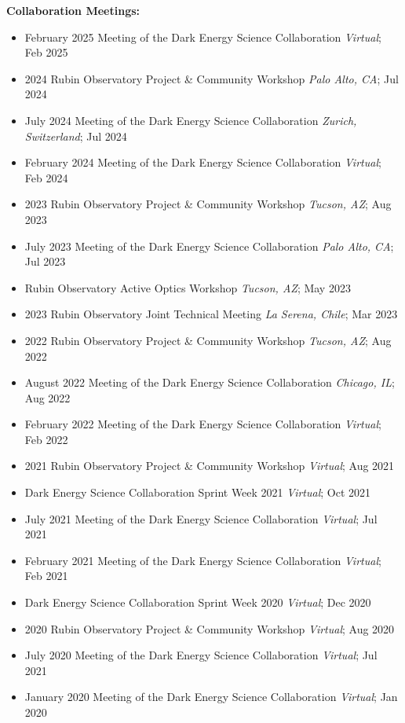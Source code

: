 \textbf{Collaboration Meetings:}
\begin{itemize}
    \item February 2025 Meeting of the Dark Energy Science Collaboration \hfill \textit{Virtual}; Feb 2025
    \item 2024 Rubin Observatory Project \& Community Workshop \hfill \textit{Palo Alto, CA}; Jul 2024
    \item July 2024 Meeting of the Dark Energy Science Collaboration \hfill \textit{Zurich, Switzerland}; Jul 2024
    \item February 2024 Meeting of the Dark Energy Science Collaboration \hfill \textit{Virtual}; Feb 2024
    \item 2023 Rubin Observatory Project \& Community Workshop \hfill \textit{Tucson, AZ}; Aug 2023
    \item July 2023 Meeting of the Dark Energy Science Collaboration \hfill \textit{Palo Alto, CA}; Jul 2023
    \item Rubin Observatory Active Optics Workshop \hfill \textit{Tucson, AZ}; May 2023
    \item 2023 Rubin Observatory Joint Technical Meeting \hfill \textit{La Serena, Chile}; Mar 2023
    \item 2022 Rubin Observatory Project \& Community Workshop \hfill \textit{Tucson, AZ}; Aug 2022
    \item August 2022 Meeting of the Dark Energy Science Collaboration \hfill \textit{Chicago, IL}; Aug 2022
    \item February 2022 Meeting of the Dark Energy Science Collaboration \hfill \textit{Virtual}; Feb 2022
    \item 2021 Rubin Observatory Project \& Community Workshop \hfill \textit{Virtual}; Aug 2021
    \item Dark Energy Science Collaboration Sprint Week 2021 \hfill \textit{Virtual}; Oct 2021
    \item July 2021 Meeting of the Dark Energy Science Collaboration \hfill \textit{Virtual}; Jul 2021
    \item February 2021 Meeting of the Dark Energy Science Collaboration \hfill \textit{Virtual}; Feb 2021
    \item Dark Energy Science Collaboration Sprint Week 2020 \hfill \textit{Virtual}; Dec 2020
    \item 2020 Rubin Observatory Project \& Community Workshop \hfill \textit{Virtual}; Aug 2020
    \item July 2020 Meeting of the Dark Energy Science Collaboration \hfill \textit{Virtual}; Jul 2021
    \item January 2020 Meeting of the Dark Energy Science Collaboration \hfill \textit{Virtual}; Jan 2020
\end{itemize}
